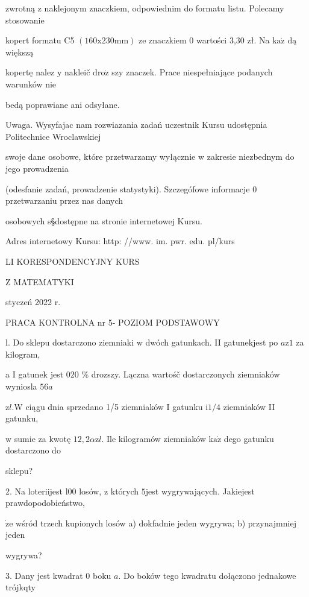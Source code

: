 \documentclass[a4paper,12pt]{article}
\begin{document}
zwrotną $\mathrm{z}$ naklejonym znaczkiem, odpowiednim do formatu listu. Polecamy stosowanie

kopert formatu C5 $(160\mathrm{x}230\mathrm{m}\mathrm{m})$ ze znaczkiem $0$ wartości 3,30 zł. Na $\mathrm{k}\mathrm{a}\dot{\mathrm{z}}$ dą większą

kopertę nalez $\mathrm{y}$ nakleič $\mathrm{d}\mathrm{r}\mathrm{o}\dot{\mathrm{z}}$ szy znaczek. Prace niespełniające podanych warunków nie

bedą poprawiane ani odsyłane.

Uwaga. Wysyfajac nam rozwiazania zadań uczestnik Kursu udostępnia Politechnice Wroclawskiej

swoje dane osobowe, które przetwarzamy wyłącznie $\mathrm{w}$ zakresie niezbednym do jego prowadzenia

(odesfanie zadań, prowadzenie statystyki). Szczegófowe informacje $0$ przetwarzaniu przez nas danych

osobowych s\S dostępne na stronie internetowej Kursu.

Adres internetowy Kursu: http: //www. im. pwr. edu. pl/kurs







LI KORESPONDENCYJNY KURS

Z MATEMATYKI

styczeń 2022 r.

PRACA KONTROLNA nr 5- POZIOM PODSTAWOWY

l. Do sklepu dostarczono ziemniaki $\mathrm{w}$ dwóch gatunkach. II gatunekjest po $a\mathrm{z}1$ za kilogram,

a I gatunek jest $020$ \% drozszy. Lączna wartośč dostarczonych ziemniaków wyniosla $56a$

$\mathrm{z}l. \mathrm{W}$ ciągu dnia sprzedano 1/5 ziemniaków I gatunku $\mathrm{i} 1/4$ ziemniaków II gatunku,

$\mathrm{w}$ sumie za kwotę $12,2\alpha \mathrm{z}l$. Ile kilogramów ziemniaków $\mathrm{k}\mathrm{a}\dot{\mathrm{z}}$ dego gatunku dostarczono do

sklepu?

2. Na loteriijest l00 losów, $\mathrm{z}$ których $5$jest wygrywających. Jakiejest prawdopodobieństwo,

$\dot{\mathrm{z}}\mathrm{e}$ wśród trzech kupionych losów a) dokfadnie jeden wygrywa; b) przynajmniej jeden

wygrywa?

3. Dany jest kwadrat $0$ boku $a$. Do boków tego kwadratu dołączono jednakowe trójkqty
\end{document}
